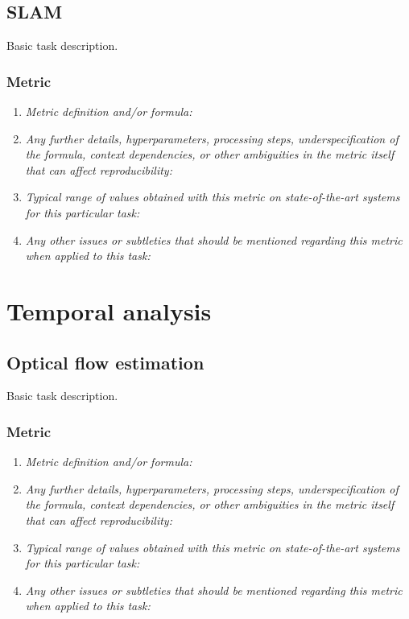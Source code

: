 \documentclass[a4paper,11pt]{article}
\begin{document}
\subsection{SLAM} \label{slam}
    Basic task description.
    \subsubsection{Metric}
        \begin{enumerate}[label=\alph*.]
            \item \textit{Metric definition and/or formula:}
            \bigskip
            \item \textit{Any further details, hyperparameters, processing steps, underspecification of the formula, context dependencies, or other ambiguities in the metric itself that can affect reproducibility:}
            \bigskip
            \item \textit{Typical range of values obtained with this metric on state-of-the-art systems for this particular task:}
            \bigskip
            \item \textit{Any other issues or subtleties that should be mentioned regarding this metric when applied to this task:}
            \bigskip
        \end{enumerate}

\section{Temporal analysis}
\subsection{Optical flow estimation} \label{optical_flow_estimation}
    Basic task description.
    \subsubsection{Metric}
        \begin{enumerate}[label=\alph*.]
            \item \textit{Metric definition and/or formula:}
            \bigskip
            \item \textit{Any further details, hyperparameters, processing steps, underspecification of the formula, context dependencies, or other ambiguities in the metric itself that can affect reproducibility:}
            \bigskip
            \item \textit{Typical range of values obtained with this metric on state-of-the-art systems for this particular task:}
            \bigskip
            \item \textit{Any other issues or subtleties that should be mentioned regarding this metric when applied to this task:}
            \bigskip
        \end{enumerate}
\end{document}
